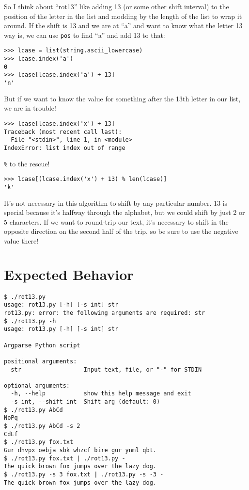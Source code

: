 \documentclass[]{article}
\begin{document}
So I think about ``rot13'' like adding 13 (or some other shift interval)
to the position of the letter in the list and modding by the length of
the list to wrap it around. If the shift is 13 and we are at ``a'' and
want to know what the letter 13 way is, we can use \texttt{pos} to find
``a'' and add 13 to that:

\begin{verbatim}
>>> lcase = list(string.ascii_lowercase)
>>> lcase.index('a')
0
>>> lcase[lcase.index('a') + 13]
'n'
\end{verbatim}

But if we want to know the value for something after the 13th letter in
our list, we are in trouble!

\begin{verbatim}
>>> lcase[lcase.index('x') + 13]
Traceback (most recent call last):
  File "<stdin>", line 1, in <module>
IndexError: list index out of range
\end{verbatim}

\texttt{\%} to the rescue!

\begin{verbatim}
>>> lcase[(lcase.index('x') + 13) % len(lcase)]
'k'
\end{verbatim}

It's not necessary in this algorithm to shift by any particular number.
13 is special because it's halfway through the alphabet, but we could
shift by just 2 or 5 characters. If we want to round-trip our text, it's
necessary to shift in the opposite direction on the second half of the
trip, so be sure to use the negative value there!

\hypertarget{expected-behavior-4}{%
\section{Expected Behavior}\label{expected-behavior-4}}

\begin{verbatim}
$ ./rot13.py
usage: rot13.py [-h] [-s int] str
rot13.py: error: the following arguments are required: str
$ ./rot13.py -h
usage: rot13.py [-h] [-s int] str

Argparse Python script

positional arguments:
  str                  Input text, file, or "-" for STDIN

optional arguments:
  -h, --help           show this help message and exit
  -s int, --shift int  Shift arg (default: 0)
$ ./rot13.py AbCd
NoPq
$ ./rot13.py AbCd -s 2
CdEf
$ ./rot13.py fox.txt
Gur dhvpx oebja sbk whzcf bire gur ynml qbt.
$ ./rot13.py fox.txt | ./rot13.py -
The quick brown fox jumps over the lazy dog.
$ ./rot13.py -s 3 fox.txt | ./rot13.py -s -3 -
The quick brown fox jumps over the lazy dog.
\end{verbatim}
\end{document}
